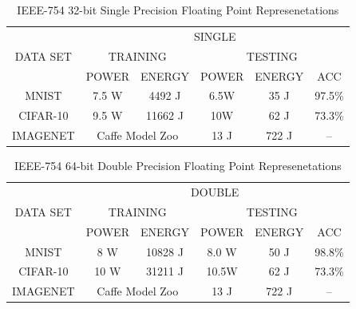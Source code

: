 \documentclass[letterpaper, 10 pt, conference]{ieeeconf}
\begin{document}
\begin{table}[ht]
  \centering
  \caption{IEEE-754 32-bit Single Precision Floating Point Represenetations}
  \label{my-label}
  \begin{tabular}{|c|c|c|c|c|c|}
    \hline
    \multirow{3}{*}{DATA SET} & \multicolumn{5}{c|}{SINGLE}                                                     \\ \cline{2-6} 
                              & \multicolumn{2}{c|}{TRAINING}                    & \multicolumn{3}{c|}{TESTING} \\ \cline{2-6} 
                              & POWER                  & ENERGY                  & POWER  & ENERGY  & ACC  \\ \hline
    MNIST                     & 7.5 W                  & 4492 J                  & 6.5W   & 35 J    & 97.5\%    \\ \hline
    CIFAR-10                     & 9.5 W                  & 11662 J                 & 10W    & 62 J    & 73.3\%    \\ \hline
    IMAGENET                  & \multicolumn{2}{c|}{Caffe Model Zoo}             & 13 J   & 722 J   & --        \\ \hline
  \end{tabular}
\end{table}

\begin{table}[ht]
  \centering
  \caption{IEEE-754 64-bit Double Precision Floating Point Represenetations}
  \label{my-label}
  \begin{tabular}{|c|c|c|c|c|c|}
    \hline
    \multirow{3}{*}{DATA SET} & \multicolumn{5}{c|}{DOUBLE}                                                     \\ \cline{2-6} 
                              & \multicolumn{2}{c|}{TRAINING}                    & \multicolumn{3}{c|}{TESTING} \\ \cline{2-6} 
                              & POWER                  & ENERGY                  & POWER  & ENERGY  & ACC  \\ \hline
    MNIST                     & 8 W                    & 10828 J                 & 8.0 W  & 50 J    & 98.8\%    \\ \hline
    CIFAR-10                     & 10 W                   & 31211 J                 & 10.5W  & 62 J    & 73.3\%    \\ \hline
    IMAGENET                  & \multicolumn{2}{c|}{Caffe Model Zoo}             & 13 J   & 722 J   & --        \\ \hline
  \end{tabular}
\end{table}
\end{document}
